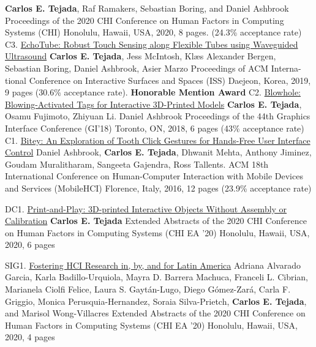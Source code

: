 \begin{cvpublications}
        {\textbf{Carlos E. Tejada}, Raf Ramakers, Sebastian Boring, and Daniel Ashbrook}%
        {Proceedings of the 2020 CHI Conference on Human Factors in Computing Systems (CHI)}%
        {Honolulu, Hawaii, USA, 2020, 8 pages. (24.3\% acceptance rate)}
      \cvpublication%
        {C3.}
        {\href{https://doi.org/10.1145/3343055.3359712}{EchoTube: Robust Touch Sensing along Flexible Tubes using Waveguided Ultrasound}}%
        {\textbf{Carlos E. Tejada}, Jess McIntosh, Klæs Alexander Bergen, Sebastian Boring, Daniel Ashbrook, Asier Marzo}%
        {Proceedings of ACM Interna- tional Conference on Interactive Surfaces and Spaces (ISS)}%
        {Daejeon, Korea, 2019, 9 pages (30.6\% acceptance rate). \bf Honorable Mention Award}
      \cvpublication%
        {C2.}%
        {\href{https://doi.org/10.20380/GI2018.18}{Blowhole: Blowing-Activated Tags for Interactive 3D-Printed Models}}%
        {\textbf{Carlos E. Tejada}, Osamu Fujimoto, Zhiyuan Li. Daniel Ashbrook}%
        {Proceedings of the 44th Graphics Interface Conference (GI’18)}%
        {Toronto, ON, 2018, 6 pages (43\% acceptance rate)}
      \cvpublication%
        {C1.}%
        {\href{https://doi.org/10.1145/2935334.2935389}{Bitey: An Exploration of Tooth Click Gestures for Hands-Free User Interface Control}}%
        {Daniel Ashbrook, \textbf{Carlos E. Tejada}, Dhwanit Mehta, Anthony Jiminez, Goudam Muralitharam, Sangeeta Gajendra, Ross Tallents.}%
        {ACM 18th International Conference on Human-Computer Interaction with Mobile Devices and Services (MobileHCI)}%
        {Florence, Italy, 2016, 12 pages (23.9\% acceptance rate)}
    \end{cvpublications}

  \pagebreak
    \begin{cvpublications}
      \cvpublication%
        {DC1.}%
        {\href{https://doi.org/10.1145/3334480.3375025}{Print-and-Play: 3D-printed Interactive Objects Without Assembly or Calibration}}%
        {\textbf{Carlos E. Tejada}}%
        {Extended Abstracts of the 2020 CHI Conference on Human Factors in Computing Systems (CHI EA ’20)}%
        {Honolulu, Hawaii, USA, 2020, 6 pages}
    \end{cvpublications}

    \begin{cvpublications}
      \cvpublication%
        {SIG1.}%
        {\href{https://doi.org/10.1145/3334480.3381055}{Fostering HCI Research in, by, and for Latin America}}%
        {Adriana Alvarado Garcia, Karla Badillo-Urquiola, Mayra D. Barrera Machuca, Franceli L. Cibrian, Marianela Ciolfi Felice, Laura S. Gaytán-Lugo, Diego Gómez-Zará, Carla F. Griggio, Monica Perusquia-Hernandez, Soraia Silva-Prietch, \textbf{Carlos E. Tejada}, and Marisol Wong-Villacres}%
        {Extended Abstracts of the 2020 CHI Conference on Human Factors in Computing Systems (CHI EA ’20)}%
        {Honolulu, Hawaii, USA, 2020, 4 pages}
    \end{cvpublications}
